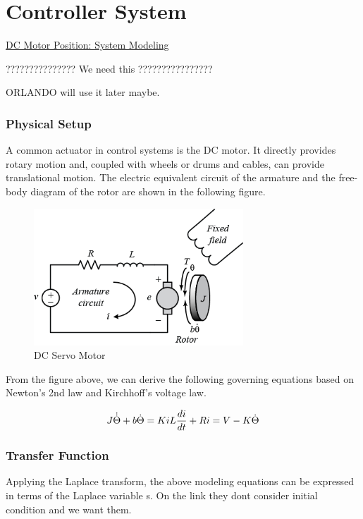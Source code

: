 \chapter{Controller System}\label{sec:controller_sys}
\href{http://ctms.engin.umich.edu/CTMS/index.php?example=MotorPosition&section=SystemModeling}{DC Motor Position: System Modeling}


??????????????? We need this ????????????????

ORLANDO will use it later maybe.

\subsection{Physical Setup}
A common actuator in control systems is the DC motor. It directly provides rotary motion and, coupled with wheels or drums and cables, can provide translational motion. The electric equivalent circuit of the armature and the free-body diagram of the rotor are shown in the following figure. 

\begin{figure}[h!]\label{fig:motor_model}
	\centering
	\includegraphics[width=0.7\textwidth]{figures/motor.png}
	\caption{DC Servo Motor}
\end{figure}

From the figure above, we can derive the following governing equations based on Newton's 2nd law and Kirchhoff's voltage law.

\begin{equation}
	J \dot{\dot{\Theta}} + b\dot{\Theta} = Ki \\
	L\frac{di}{dt} + Ri = V - K\dot{\Theta}
\end{equation}

\subsection{Transfer Function}
Applying the Laplace transform, the above modeling equations can be expressed in terms of the Laplace variable s. On the link they dont consider initial condition and we want them.

